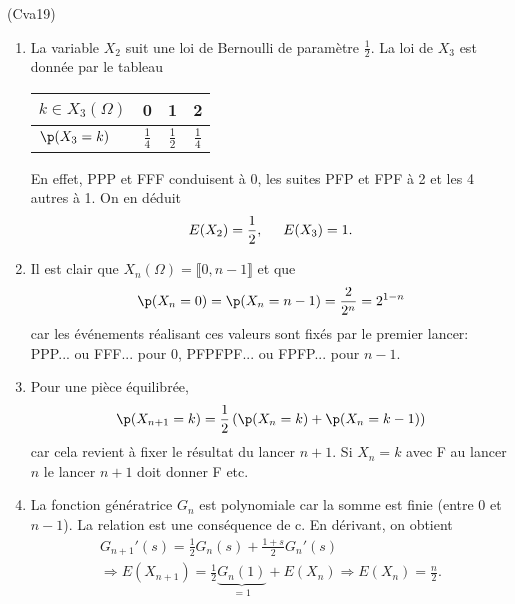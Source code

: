 \begin{tiny}(Cva19)\end{tiny}
\begin{enumerate}
  \item La variable $X_2$ suit une loi de Bernoulli de paramètre $\frac{1}{2}$. La loi de $X_3$ est donnée par le tableau
\begin{center}
\renewcommand{\arraystretch}{1.5}
\begin{tabular}{|l|c|c|c|} \hline
$k\in X_3(\Omega)$ & 0             & 1 & 2\\ \hline
$\p(X_3=k)$   & $\frac{1}{4}$ & $\frac{1}{2}$ & $\frac{1}{4}$ \\ \hline
\end{tabular}
\end{center}\smallskip
En effet, PPP et FFF conduisent à 0, les suites PFP et FPF à 2 et les 4 autres à 1. On en déduit 
\begin{displaymath}
E(X_2)=\frac{1}{2}, \hspace{0.5cm} E(X_3)=1.
\end{displaymath}


  \item Il est clair que $X_n(\Omega) = \llbracket 0,n-1 \rrbracket$ et que 
\begin{displaymath}
\p(X_n=0)=\p(X_n=n-1) = \frac{2}{2^{n}} =2^{1-n} 
\end{displaymath}
car les événements réalisant ces valeurs sont fixés par le premier lancer: PPP... ou FFF... pour 0, PFPFPF... ou FPFP... pour $n-1$.
  \item Pour une pièce équilibrée,
\begin{displaymath}
\p(X_{n+1}=k) = \frac{1}{2}\left( \p(X_{n}=k) + \p(X_{n}=k-1)\right)   
\end{displaymath}
car cela revient à fixer le résultat du lancer $n+1$. Si $X_n=k$ avec F au lancer $n$ le lancer $n+1$ doit donner F etc.

\item La fonction génératrice $G_n$ est polynomiale car la somme est finie (entre $0$ et $n-1$). La relation est une conséquence de c. En dérivant, on obtient
\begin{multline*}
G_{n+1}'(s) = \frac{1}{2}G_n(s) + \frac{1+s}{2}G_n'(s)\\
\Rightarrow E(X_{n+1}) = \frac{1}{2} \underset{=1}{\underbrace{G_n(1)}} + E(X_n)
\Rightarrow E(X_n) = \frac{n}{2}.
\end{multline*}

\end{enumerate}
